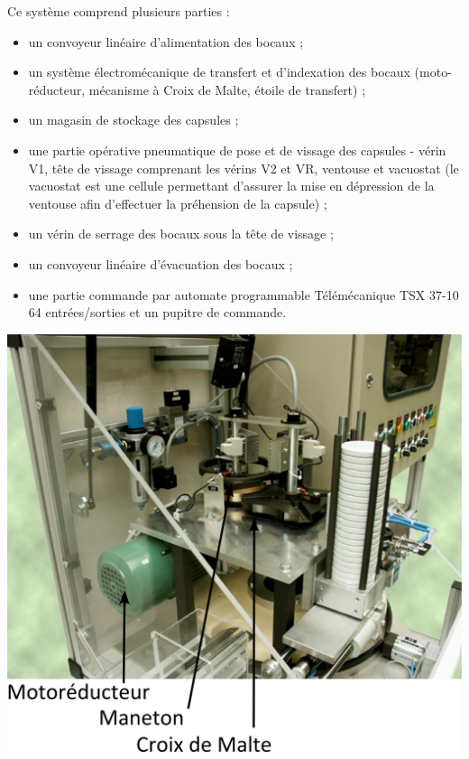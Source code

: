 \documentclass[10pt,oneside]{article}
\begin{document}
\vspace{1cm}
\begin{minipage}[c]{.55\linewidth}
Ce système comprend plusieurs parties :
\begin{itemize}
\item un convoyeur linéaire d'alimentation des bocaux ;
\item un système électromécanique de transfert et d'indexation des bocaux (moto-réducteur, mécanisme à Croix de Malte, étoile de transfert) ;
\item un magasin de stockage des capsules ;
\item une partie opérative pneumatique de pose et de vissage des capsules - vérin V1, tête de vissage comprenant les vérins V2 et VR, ventouse et vacuostat (le vacuostat est une cellule permettant d'assurer la mise en dépression de la ventouse afin d'effectuer la préhension de la capsule) ;
\item un vérin de serrage des bocaux sous la tête de vissage ;
\item un convoyeur linéaire d'évacuation des bocaux ;
\item une partie commande par automate programmable Télémécanique TSX 37-10 64 entrées/sorties et un pupitre de commande.
\end{itemize}

\end{minipage} \hfill
\begin{minipage}[c]{.4\linewidth}
\begin{center}
 \includegraphics[width=\textwidth]{png/systeme3}
\end{center}
\end{minipage}
\end{document}
